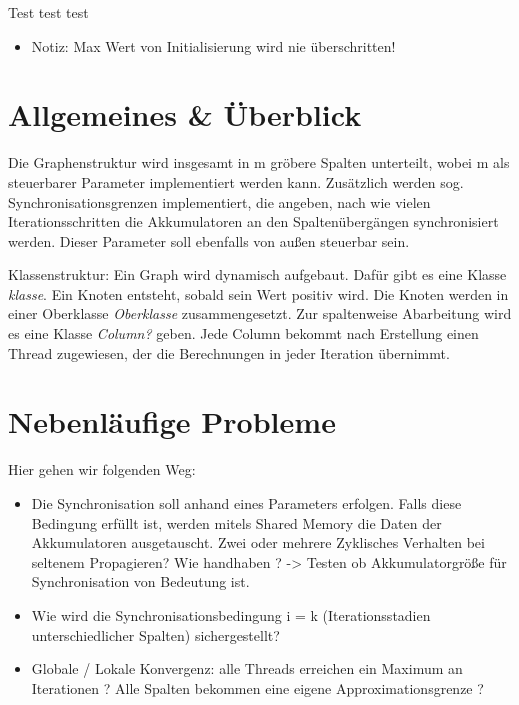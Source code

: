 
\usepackage{pdfpages}
\usepackage{listings}



\newcommand{\subttl}{\textbf{Milestone 1}}
\newcommand{\StudNameOne}{Jens Heinen (2542182)}
\newcommand{\StudNameTwo}{Lukas Schaal (2539218)}
\newcommand{\StudNameThree}{Christoph Rosenhauer (2549220)}

\newcommand{\ndt}{Nichtdeterminismus }
Test test test

\begin{itemize}
	\item Notiz: Max Wert von Initialisierung wird nie überschritten!
	
\end{itemize}
\section{Allgemeines \& Überblick}
Die Graphenstruktur wird insgesamt in m gröbere Spalten unterteilt, wobei m als steuerbarer Parameter implementiert werden kann. Zusätz\-lich werden sog. Synchronisationsgrenzen implementiert, die angeben, nach wie vielen Iterationsschritten die Akkumulatoren an den Spaltenübergängen synchronisiert werden. Dieser Parameter soll ebenfalls von außen steuerbar sein. 

Klassenstruktur: 
Ein Graph wird dynamisch aufgebaut. Dafür gibt es eine Klasse \textit{klasse}. Ein Knoten entsteht, sobald sein Wert positiv wird. Die Knoten werden in einer Oberklasse \textit{Oberklasse} zusammengesetzt. Zur spaltenweise Abarbeitung wird es eine Klasse \textit{Column?} geben. Jede Column bekommt nach Erstellung einen Thread zugewiesen, der die Berechnungen in jeder Iteration übernimmt. 

\section{Nebenläufige Probleme}
Hier gehen wir folgenden Weg:
\begin{itemize}
	\item Die Synchronisation soll anhand eines Parameters erfolgen. Falls diese Bedingung erfüllt ist, werden mitels Shared Memory die Daten der Akkumulatoren ausgetauscht. Zwei oder mehrere Zyklisches Verhalten bei seltenem Propagieren? Wie handhaben ?
	-> Testen ob Akkumulatorgröße für Synchronisation von Bedeutung ist. 
	\item Wie wird die Synchronisationsbedingung i = k (Iterationsstadien unterschiedlicher Spalten) sichergestellt?
	\item Globale / Lokale Konvergenz: alle Threads erreichen ein Maximum an Iterationen ? Alle Spalten bekommen eine eigene Approximationsgrenze ? 
\end{itemize}

